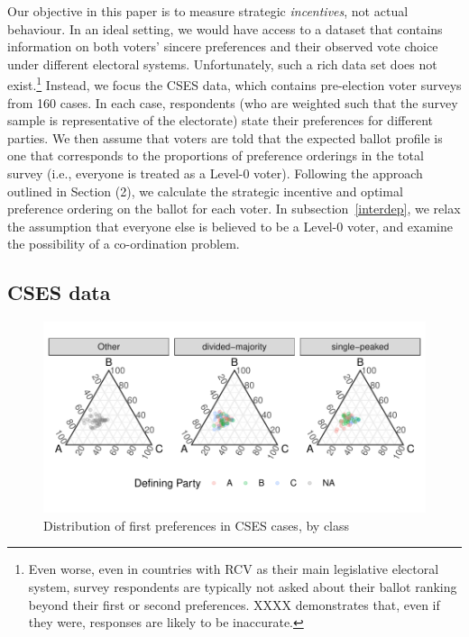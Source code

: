 \documentclass[11pt, letter]{article}
\begin{document}
Our objective in this paper is to measure strategic \emph{incentives}, not actual behaviour. In an ideal setting, we would have access to a dataset that contains information on both voters' sincere preferences and their observed vote choice under different electoral systems. Unfortunately, such a rich data set does not exist.\footnote{Even worse, even in countries with RCV as their main legislative electoral system, survey respondents are typically not asked about their ballot ranking beyond their first or second preferences. XXXX demonstrates that, even if they were, responses are likely to be inaccurate.} Instead, we focus the CSES data, which contains pre-election voter surveys from 160 cases. In each case, respondents (who are weighted such that the survey sample is representative of the electorate) state their preferences for different parties. We then assume that voters are told that the expected ballot profile is one that corresponds to the proportions of preference orderings in the total survey (i.e., everyone is treated as a Level-0 voter). Following the approach outlined in Section (2), we calculate the strategic incentive and optimal preference ordering on the ballot for each voter. In subsection~\ref{interdep}, we relax the assumption that everyone else is believed to be a Level-0 voter, and examine the possibility of a co-ordination problem.

\subsection{CSES data}




\begin{figure}[!htb]
	\centering
	\includegraphics[width = \textwidth]{../output/figures/cses_fp.pdf}
	\caption{Distribution of first preferences in CSES cases, by class}
	\label{fig:cses_fp}
\end{figure}
\end{document}
